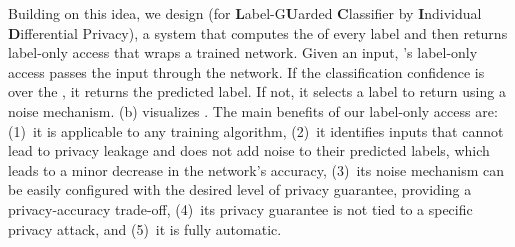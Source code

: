 Building on this idea, we design
\tool (for \textbf{L}abel-G\textbf{U}arded \textbf{C}lassifier by \textbf{I}ndividual \textbf{D}ifferential Privacy), a system that computes the \propa of every label and then returns \propi label-only access that wraps a trained network. %
Given an input, \tool's label-only access passes the input through the network. If the classification confidence is over the \propa, it returns the predicted label. If not, it selects a label to return using a noise mechanism.  %
(b) visualizes \tool. 
The main benefits of our \propi label-only access are: (1)~it is applicable to any training algorithm, 
(2)~it identifies inputs that cannot lead to privacy leakage and does not add noise to their predicted labels, which leads to a minor decrease in the network's accuracy,
(3)~its noise mechanism can be easily configured with the desired level of privacy guarantee, providing a privacy-accuracy trade-off,
(4)~its privacy guarantee is not tied to a specific privacy attack,  
 and (5)~it is fully automatic.




